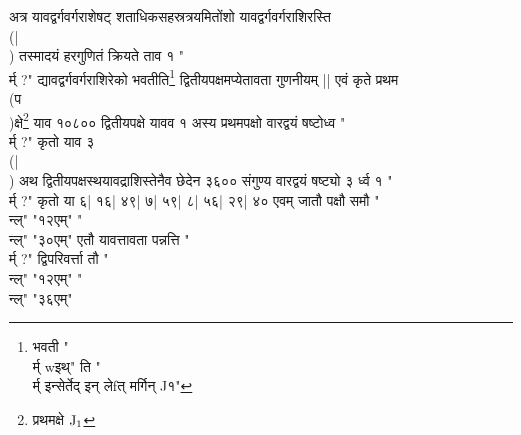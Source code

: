 \documentclass[12pt]{article}
\begin{document}
{अत्र यावद्वर्गवर्गराशेषट् शताधिकसहस्रत्रयमितोंशो
यावद्वर्गवर्गराशिरस्ति\\(|\\)
तस्मादयं हरगुणितं क्रियते ताव १ "{\\र्म् ?}" द्यावद्वर्गवर्गराशिरेको
भवतीति\footnote{{\s भवती }"{\\र्म् wइथ्}" ति "{\\र्म् इन्सेर्तेद् इन् लेfत् मर्गिन् J१}"}
द्वितीयपक्षमप्येतावता गुणनीयम् ||
एवं कृते
प्रथम\\(प\\)क्षे\footnote{{\s प्रथमक्षे }${\rm J_1}$}
याव १०८०० द्वितीयपक्षे यावव १ अस्य प्रथमपक्षो
वारद्वयं षष्टोध्व "{\\र्म् ?}" कृतो याव ३\\(|\\)
अथ द्वितीयपक्षस्थयावद्राशिस्तेनैव छेदेन ३६००
संगुण्य वारद्वयं षष्ट्यो ३ र्ध्व १ "{\\र्म् ?}" कृतो
या ६| १६| ४९| ७| ५९| ८| ५६| २९| ४०
एवम् जातौ पक्षौ समौ
"\\न्ल्"
"{१२एम्}"
"\\न्ल्"
"{३०एम्}"
एतौ यावत्तावता पन्नत्ति "{\\र्म् ?}" द्विपरिवर्त्ता तौ
"\\न्ल्"
"{१२एम्}"
"\\न्ल्"
"{३६एम्}"

}
\end{document}
